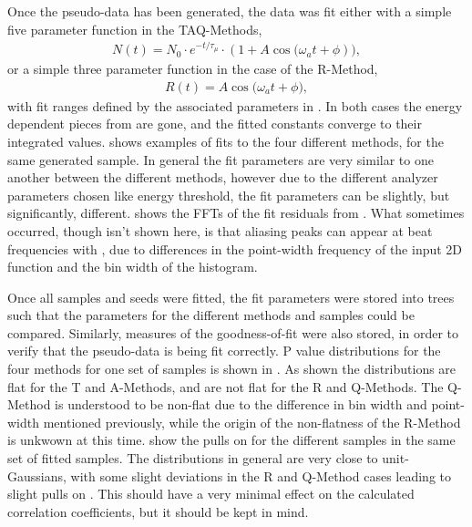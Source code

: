 Once the pseudo-data has been generated, the data was fit either with a simple five parameter function in the TAQ-Methods,
\begin{align}
    N(t) = N_{0} \cdot e^{-t/\tau_{\mu}} \cdot (1 + A \cos{(\omega_{a}t + \phi})),
\label{eq:fiveParFit}
\end{align}
or a simple three parameter function in the case of the R-Method,
\begin{align}
    R(t) =A \cos{(\omega_{a}t + \phi}),
\label{eq:ratioFit}
\end{align}
with fit ranges defined by the associated parameters in . In both cases the energy dependent pieces from  are gone, and the fitted constants  converge to their integrated values.  shows examples of fits to the four different methods, for the same generated sample. In general the fit parameters are very similar to one another between the different methods, however due to the different analyzer parameters chosen like energy threshold, the fit parameters can be slightly, but significantly, different.  shows the FFTs of the fit residuals from . What sometimes occurred, though isn't shown here, is that aliasing peaks can appear at beat frequencies with \wa, due to differences in the point-width frequency of the input 2D function and the bin width of the histogram. 

Once all samples and seeds were fitted, the fit parameters were stored into \ROOT trees such that the parameters for the different methods and samples could be compared. Similarly, measures of the goodness-of-fit were also stored, in order to verify that the pseudo-data is being fit correctly. P value distributions for the four methods for one set of samples is shown in . As shown the distributions are flat for the T and A-Methods, and are not flat for the R and Q-Methods. The Q-Method is understood to be non-flat due to the difference in bin width and point-width mentioned previously, while the origin of the non-flatness of the R-Method is unkwown at this time.  show the pulls on \R for the different samples in the same set of fitted samples. The distributions in general are very close to unit-Gaussians, with some slight deviations in the R and Q-Method cases leading to slight pulls on \R. This should have a very minimal effect on the calculated correlation coefficients, but it should be kept in mind.



